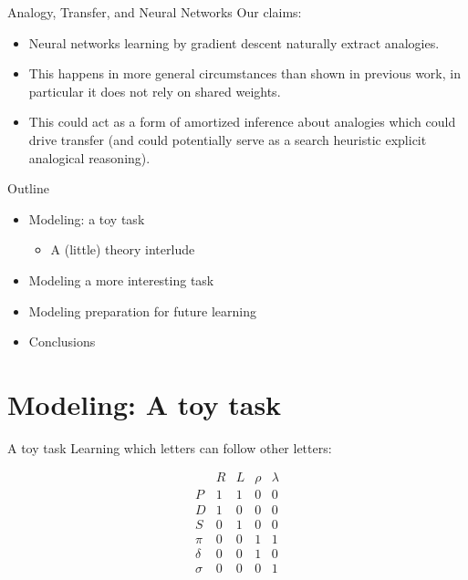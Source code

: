 \documentclass{beamer}
\begin{document}
\begin{frame}{Analogy, Transfer, and Neural Networks}
Our claims:
\begin{itemize}
    \item<1-> Neural networks learning by gradient descent naturally extract analogies. 
    \item<2-> This happens in more general circumstances than shown in previous work, in particular it does not rely on shared weights.
    \item<3-> This could act as a form of amortized inference about analogies which could drive transfer (and could potentially serve as a search heuristic explicit analogical reasoning).
\end{itemize}
\end{frame}

\begin{frame}{Outline}
\begin{itemize}[<+->]
\item Modeling: a toy task 
\begin{itemize}
    \item A (little) theory interlude 
\end{itemize}
\item Modeling a more interesting task 
\item Modeling preparation for future learning
\item Conclusions
\end{itemize}
\end{frame}
\section{Modeling: A toy task}
\begin{frame}{A toy task}
Learning which letters can follow other letters:\vspace{-2em}
\begin{center}
\[
\begin{array}{c|cccc} 
& R & L & \rho & \lambda \\
\hline
P & 1 & 1 & 0 & 0 \\ 
D & 1 & 0 & 0 & 0 \\
S & 0 & 1 & 0 & 0 \\
\pi    & 0 & 0 & 1 & 1 \\ 
\delta & 0 & 0 & 1 & 0 \\
\sigma & 0 & 0 & 0 & 1 \\
\end{array} 
\]
\end{center}
\end{frame}
\end{document}
